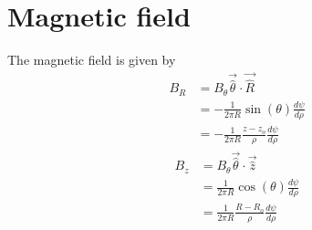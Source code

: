 \documentclass{article}
\begin{document}
\section{Magnetic field}

The magnetic field is given by
\[\begin{aligned} 
    B_R &= B_\theta \vec{\hat{\theta}}\cdot \vec{\hat{R}} \\
    &= -\frac{1}{2\pi R}\sin(\theta) \frac{d\psi}{d\rho} \\
    &= -\frac{1}{2\pi R}\frac{z - z_o}{\rho}\frac{d\psi}{d\rho}
\end{aligned}\]
\[\begin{aligned} 
B_z &= B_\theta \vec{\hat{\theta}}\cdot \vec{\hat{z}} \\
&= \frac{1}{2\pi R}\cos(\theta)\frac{d\psi}{d\rho} \\
&= \frac{1}{2\pi R}\frac{R-R_o}{\rho}\frac{d\psi}{d\rho}
\end{aligned}\]
\end{document}
